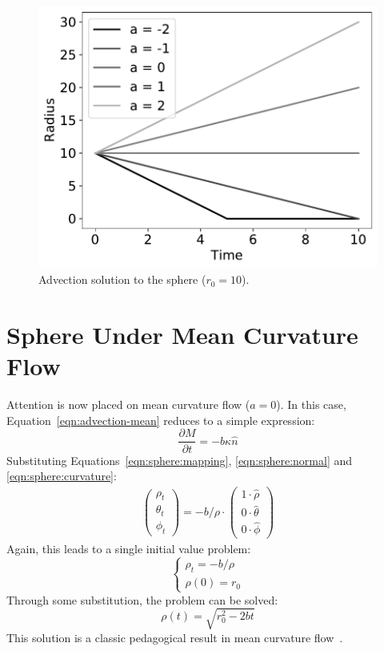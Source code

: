 \documentclass[journal]{IEEEtran}
\begin{document}
\begin{figure}[t]
  \centering
    \includegraphics[width=0.9\linewidth]{advection}%
  \caption{Advection solution to the sphere ($r_0 = 10$).}
  \label{fig:advection}
\end{figure}

\section{Sphere Under Mean Curvature Flow}
\label{sec:meanflow}
Attention is now placed on mean curvature flow ($a = 0$).
In this case, Equation~\ref{eqn:advection-mean} reduces to a simple expression:
\begin{equation}
  \label{eqn:mean}
  \frac{\partial M}{\partial t} = -b \kappa \hat{n}
\end{equation}
Substituting Equations~\ref{eqn:sphere:mapping}, \ref{eqn:sphere:normal} and \ref{eqn:sphere:curvature}:
\begin{align}
  \begin{pmatrix}
    \rho_t \\
    \theta_t \\
    \phi_t
  \end{pmatrix} = -b / \rho \cdot
  \begin{pmatrix}
    1 \cdot \hat{\rho} \\
    0 \cdot \hat{\theta} \\
    0 \cdot \hat{\phi}
  \end{pmatrix}
\end{align}
Again, this leads to a single initial value problem:
\begin{equation}
  \left\{
    \begin{array}{ll}
      \rho_t = -b/\rho\\
      \rho(0) = r_0
    \end{array}
  \right.
\end{equation}
Through some substitution, the problem can be solved:
\begin{equation}
  \label{eqn:mean:solution}
  \rho(t) = \sqrt{r_0^2 - 2bt}
\end{equation}
This solution is a classic pedagogical result in mean curvature flow~\cite{bellettini2014lecture}.
\end{document}
